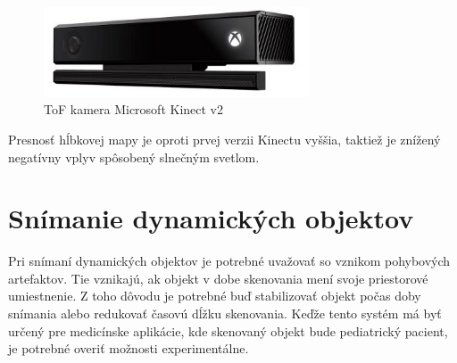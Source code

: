\begin{figure}[H]
	\centering
	\includegraphics[width=0.7\textwidth]{figures/kinect.png}
	\caption{ToF kamera Microsoft Kinect v2}
	\label{fig::kinect}
\end{figure}

Presnosť hĺbkovej mapy je oproti prvej verzii Kinectu vyššia, taktiež je znížený negatívny vplyv spôsobený slnečným svetlom.


%
%
%

\section{Snímanie dynamických objektov}

Pri snímaní dynamických objektov je potrebné uvažovať so vznikom pohybových artefaktov. Tie vznikajú, ak objekt v dobe skenovania mení svoje priestorové umiestnenie. Z toho dôvodu je potrebné buď stabilizovať objekt počas doby snímania alebo redukovať časovú dĺžku skenovania. Keďže tento systém má byť určený pre medicínske aplikácie, kde skenovaný objekt bude pediatrický pacient, je potrebné overiť možnosti experimentálne.


